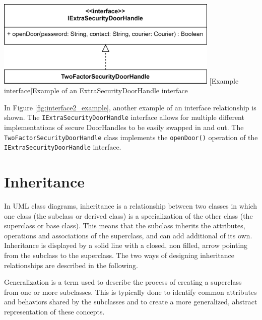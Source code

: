 \documentclass[
	12pt,
    a4paper,
    egregdoesnotlikesansseriftitles, %
    toc=chapterentrywithdots,
    oneside, openany,
    titlepage,
    parskip=half,
    headings=normal,  %
    listof=totoc,
    bibliography=totoc,
    index=totoc,
    captions=tableheading,  %
    listof=flat,
    numbers=noenddot, %
    final]
    {scrbook}
\begin{document}
\vspace{1em}
\begin{minipage}{\linewidth}
	\centering
	\includegraphics[width=0.8\textwidth]{figures/interface/doorhandle_sec_interface.jpg}
	[Example interface]{Example of an ExtraSecurityDoorHandle interface}
	\label{fig:interface2_example}
\end{minipage}
\vspace{1em}

In Figure \ref{fig:interface2_example}, another example of an interface relationship is shown. 
The \texttt{IExtraSecurityDoorHandle} interface allows for multiple different implementations of secure DoorHandles to be easily swapped in and out. The \texttt{TwoFactorSecurityDoorHandle} class implements the \texttt{openDoor()} operation of the \texttt{IExtraSecurityDoorHandle} interface.


\chapter{Inheritance}
In UML class diagrams, inheritance is a relationship between two classes in which one class (the subclass or derived class) is a specialization of the other class (the superclass or base class). 
This means that the subclass inherits the attributes, operations and associations of the superclass, and can add additional of its own.
Inheritance is displayed by a solid line with a closed, non filled, arrow pointing from the subclass to the superclass.
The two ways of designing inheritance relationships are described in the following.

Generalization is a term used to describe the process of creating a superclass from one or more subclasses. 
This is typically done to identify common attributes and behaviors shared by the subclasses and to create a more generalized, abstract representation of these concepts. \cite[p. 69-70] {seidl2015uml} \cite{ibm_generalization}
\end{document}
